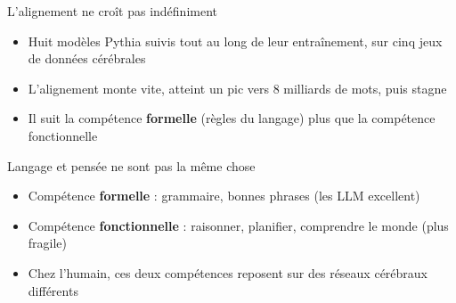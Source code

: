 \begin{frame}{L'alignement ne croît pas indéfiniment}
\begin{itemize}
    \item Huit modèles Pythia suivis tout au long de leur entraînement, sur cinq jeux de données cérébrales
    \item L'alignement monte vite, atteint un pic vers 8 milliards de mots, puis stagne
    \item Il suit la compétence \textbf{formelle} (règles du langage) plus que la compétence fonctionnelle
\end{itemize}
\end{frame}

\begin{frame}{Langage et pensée ne sont pas la même chose}
\begin{itemize}
    \item Compétence \textbf{formelle} : grammaire, bonnes phrases (les LLM excellent)
    \item Compétence \textbf{fonctionnelle} : raisonner, planifier, comprendre le monde (plus fragile)
    \item Chez l'humain, ces deux compétences reposent sur des réseaux cérébraux différents
\end{itemize}
\end{frame}
